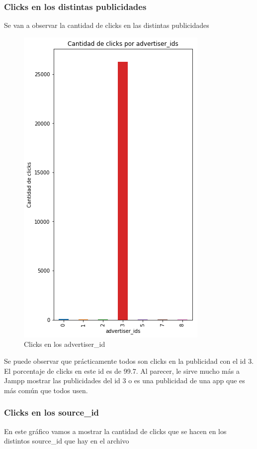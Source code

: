 \documentclass[a4paper, 12pt]{article}
\begin{document}
	\subsubsection{Clicks en los distintas publicidades}
		 Se van a observar la cantidad de clicks en las distintas publicidades

		\FloatBarrier
		\begin{figure}[h]
			\centering
			\includegraphics[scale=0.5]{images/clicks/clicks_advertiser_id.png}
			\caption{Clicks en los advertiser\_id}
		\end{figure}
		\FloatBarrier

		 Se puede observar que prácticamente todos son clicks en la publicidad con el id 3. El porcentaje de clicks en este id es de 99.7. Al parecer, le sirve mucho más a Jampp mostrar las publicidades del id 3 o es una publicidad de una app que es más común que todos usen.

	\subsubsection{Clicks en los source\_id}
		 En este gráfico vamos a mostrar la cantidad de clicks que se hacen en los distintos source\_id que hay en el archivo
		
\end{document}
